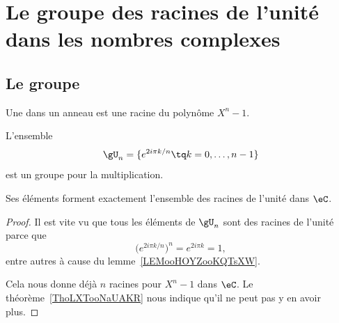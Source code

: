 
\section{Le groupe des racines de l'unité dans les nombres complexes}
\label{SecGJOLooWdMYVl}

\subsection{Le groupe}

\begin{definition}
    Une  dans un anneau est une racine du polynôme \( X^n-1\).
\end{definition}

\begin{lemmaDef}        \label{LEMooSXFBooYJmRTK}
    L'ensemble
    \begin{equation}        \label{EqIEAXooIpvFPe}
        \gU_n=\{  e^{2i\pi k/n}  \tq k=0,\ldots, n-1 \}
    \end{equation}
    est un groupe pour la multiplication.

    Ses éléments forment exactement l'ensemble des racines de l'unité dans \( \eC\).
\end{lemmaDef}

\begin{proof}
    Il est vite vu que tous les éléments de \( \gU_n\) sont des racines de l'unité parce que
    \begin{equation}
        \big(  e^{2i\pi k/n} \big)^n= e^{2i\pi k}=1,
    \end{equation}
    entre autres à cause du lemme~\ref{LEMooHOYZooKQTsXW}.

    Cela nous donne déjà \( n\) racines pour \( X^n-1\) dans \( \eC\). Le théorème~\ref{ThoLXTooNaUAKR} nous indique qu'il ne peut pas y en avoir plus.
\end{proof}

